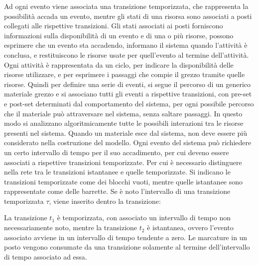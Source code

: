 \documentclass{article}
\numberwithin{equation}{subsection}
\begin{document}
Ad ogni evento viene associata una transizione temporizzata, che rappresenta la possibilità accada un evento, mentre gli stati di una risorsa sono associati a posti collegati 
alle rispettive transizioni. Gli stati 
associati ai posti forniscono informazioni sulla disponibilità di un evento e di una o più risorse, possono esprimere che un evento sta accadendo, informano il sistema 
quando l'attività è conclusa, e restituiscono le risorse usate per quell'evento al termine dell'attività. Ogni attività è rappresentata da un ciclo, per indicare la 
disponibilità delle risorse utilizzare, e per esprimere i passaggi che compie il grezzo tramite quelle risorse. Quindi per definire una serie di eventi, si segue il 
percorso di un generico materiale grezzo e si associano tutti gli eventi a rispettive transizioni, con pre-set e post-set determinati dal comportamento del sistema, per ogni 
possibile percorso che il materiale può attraversare nel sistema, senza saltare passaggi. In questo modo si analizzano algoritmicamente tutte le possibili interazioni tra le 
risorse presenti nel sistema. Quando un materiale esce dal sistema, non deve essere più considerato nella costruzione del modello. Ogni evento del sistema può richiedere 
un certo intervallo di tempo per il suo accadimento, per cui deveno essere associati a rispettive transizioni temporizzate. Per cui è necessario distinguere nella rete tra le 
transizioni istantanee e quelle temporizzate. Si indicano le transizioni temporizzate come dei blocchi vuoti, mentre quelle istantanee sono rappresentate come delle barrette. Se 
è noto l'intervallo di una transizione temporizzata $\tau$, viene inserito dentro la transizione:
\begin{center}
\end{center}
La transizione $t_1$ è temporizzata, con associato un intervallo di tempo non necessariamente noto, mentre la transizione $t_2$ è istantanea, ovvero l'evento associato avviene in un intervallo di 
tempo tendente a zero. 
Le marcature in un posto vengono consumate da una transizione solamente al termine dell'intervallo di tempo associato ad essa. 
\end{document}
